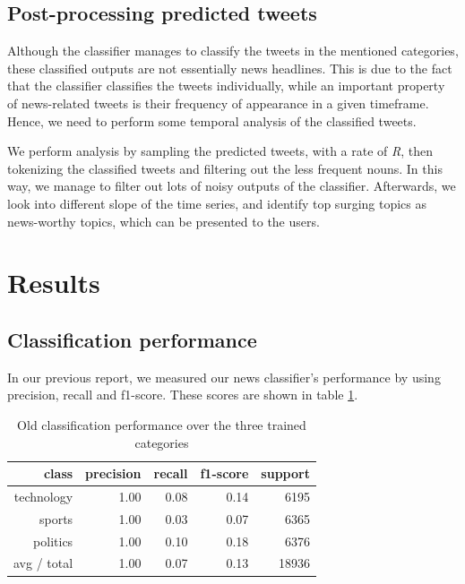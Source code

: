 \documentclass{llncs}
\begin{document}
\subsection{Post-processing predicted tweets}
\label{sec:postprocess}
Although the classifier manages to classify the tweets in the mentioned categories, these classified outputs are not essentially news headlines. This is due to the fact that the classifier classifies the tweets individually, while an important property of news-related tweets is their frequency of appearance in a given timeframe. Hence, we need to perform some temporal analysis of the classified tweets.

We perform analysis by sampling the predicted tweets, with a rate of \textit{R}, then tokenizing the classified tweets and filtering out the less frequent nouns. In this way, we manage to filter out lots of noisy outputs of the classifier. Afterwards, we look into different slope of the time series, and identify top surging topics as news-worthy topics, which can be presented to the users.


\section{Results}

\subsection{Classification performance}

In our previous report, we measured our news classifier's performance by using precision, recall and f1-score. These scores are shown in table \ref{tbl:oldclassifier}.

\begin{table}
	\begin{center}
		\begin{tabular}{|r|r|r|r|r|} \hline
			class  & precision   & recall & f1-score  & support \\ \hline
			technology    &   1.00 &     0.08  &    0.14   &   6195 \\
			sports   &    1.00   &   0.03   &   0.07   &   6365 \\
			politics   &    1.00  &    0.10   &   0.18   &   6376 \\
			avg / total  &     1.00   &   0.07  &    0.13   &  18936 \\ \hline
		\end{tabular}
	\end{center}
	\caption{Old classification performance over the three trained categories}
	\label{tbl:oldclassifier}
\end{table}
\end{document}
